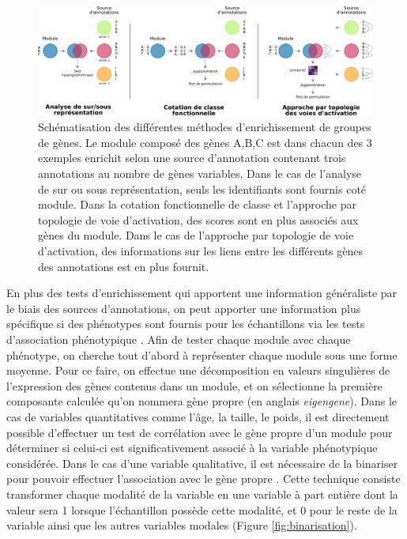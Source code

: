 \begin{figure}
    \centering
    \includegraphics[width=\textwidth]{img/intro/3_coexpr/intro_3_coexpr_enrichment_methods.pdf} 
    \caption[Schématisation des différentes méthodes d'enrichissement de groupes de gènes.]{Schématisation des différentes méthodes d'enrichissement de groupes de gènes. Le module composé des gènes A,B,C est dans chacun des 3 exemples enrichit selon une source d'annotation contenant trois annotations au nombre de gènes variables. Dans le cas de l'analyse de sur ou sous représentation, seuls les identifiants sont fournis coté module. Dans la cotation fonctionnelle de classe et l'approche par topologie de voie d'activation, des scores sont en plus associés aux gènes du module. Dans le cas de l'approche par topologie de voie d'activation, des informations sur les liens entre les différents gènes des annotations est en plus fournit.}
    \label{fig:enrichment_methods}
\end{figure}


En plus des tests d'enrichissement qui apportent une information généraliste par le biais des sources d'annotations, on peut apporter une information plus spécifique si des phénotypes sont fournis pour les échantillons via les tests d'association phénotypique \cite{Langfelder2008}. Afin de tester chaque module avec chaque phénotype, on cherche tout d'abord à représenter chaque module sous une forme moyenne. Pour ce faire, on effectue une décomposition en valeurs singulières de l'expression des gènes contenus dans un module, et on sélectionne la première composante calculée qu'on nommera gène propre (en anglais \textit{eigengene}). Dans le cas de variables quantitatives comme l'âge, la taille, le poids, il est directement possible d'effectuer un test de corrélation avec le gène propre d'un module pour déterminer si celui-ci est significativement associé à la variable phénotypique considérée. Dans le cas d'une variable qualitative, il est nécessaire de la binariser pour pouvoir effectuer l'association avec le gène propre \cite{Lemoine2021Dec}. Cette technique consiste transformer chaque modalité de la variable en une variable à part entière dont la valeur sera 1 lorsque l'échantillon possède cette modalité, et 0 pour le reste de la variable ainsi que les autres variables modales (Figure \ref{fig:binarisation}).

